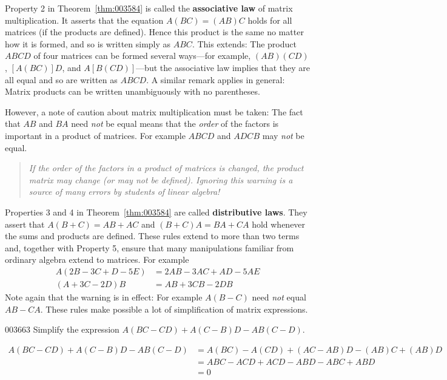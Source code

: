 Property 2 in Theorem~\ref{thm:003584} is called the \textbf{associative law} of matrix multiplication. It asserts that the equation $A(BC) = (AB)C$ holds for all matrices (if the products are defined). Hence this product is the same no matter how it is formed, and so is written simply as $ABC$. This extends: The product $ABCD$ of four matrices can be formed several ways---for example, $(AB)(CD)$, $[A(BC)]D$, and $A[B(CD)]$---but the associative law implies that they are all equal and so are written as $ABCD$. A similar remark applies in general: Matrix products can be written unambiguously with no parentheses.

However, a note of caution about matrix multiplication must be taken: The fact that $AB$ and $BA$ need \textit{not} be equal means that the \textit{order} of the factors is important in a product of matrices. For example $ABCD$ and $ADCB$ may \textit{not} be equal.

\vspace{0.5em}
\begin{quotation} {\slshape \noindent If the order of the factors in a product of matrices is changed, the product matrix may change (or may not be defined). Ignoring this warning is a source of many errors by students of linear algebra!}
\end{quotation}


Properties 3 and 4 in Theorem~\ref{thm:003584} are called \textbf{distributive laws}. They assert that $A(B + C) = AB + AC$ and $(B + C)A = BA + CA$ hold whenever the sums and products are defined. These rules extend to more than two terms and, together with Property 5, ensure that many manipulations familiar from ordinary algebra extend to matrices. For example
\begin{align*} 
A(2B - 3C + D - 5E) & = 2AB - 3AC + AD - 5AE \\
(A + 3C - 2D)B & = AB + 3CB - 2DB
\end{align*}
Note again that the warning is in effect: For example $A(B - C)$ need \textit{not} equal $AB - CA$. These rules make possible a lot of simplification of matrix expressions.


\begin{example}{}{003663}
Simplify the expression $A(BC - CD) + A(C - B)D - AB(C - D)$.


\begin{solution}
\begin{align*}
A(BC - CD) + A(C - B)D - AB(C - D) &= A(BC) - A(CD) + (AC-AB)D - (AB)C + (AB)D \\
&= ABC - ACD + ACD - ABD - ABC + ABD \\
&= 0
\end{align*}
\end{solution}
\end{example}

